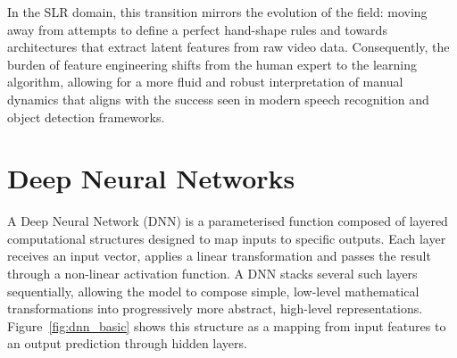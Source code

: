 In the SLR domain, this transition mirrors the evolution of the field: moving away from attempts to
define a perfect hand-shape rules and towards architectures that extract latent features from raw
video data. Consequently, the burden of feature engineering shifts from the human expert to the
learning algorithm, allowing for a more fluid and robust interpretation of manual dynamics that
aligns with the success seen in modern speech recognition and object detection frameworks.

\section{Deep Neural Networks}
\label{sec:dnn}

A Deep Neural Network (DNN) is a parameterised function composed of layered computational
structures designed to map inputs to specific outputs. Each layer receives an input vector, applies
a linear transformation and passes the result through a non-linear activation function. A DNN
stacks several such layers sequentially, allowing the model to compose simple, low-level
mathematical transformations into progressively more abstract, high-level representations.
Figure~\ref{fig:dnn_basic} shows this structure as a mapping from input features to an output
prediction through hidden layers.

